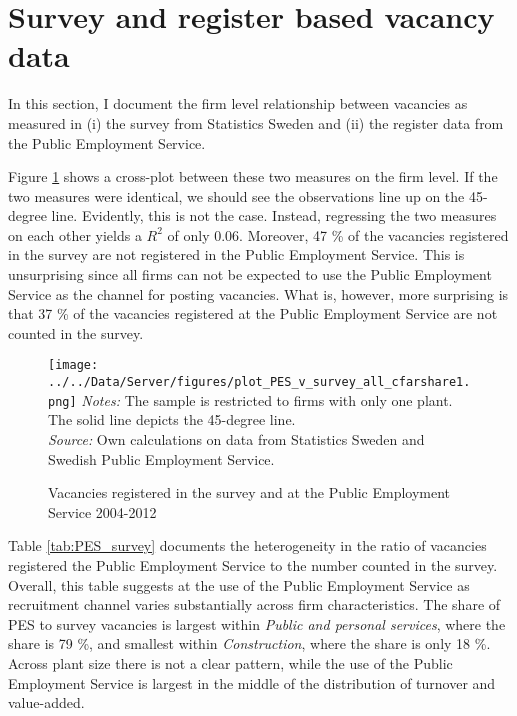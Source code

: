 \section{Survey and register based vacancy data}
\label{sec:PES_survey_rel} 

In this section, I document the firm level relationship between vacancies as measured in (i) the survey from Statistics Sweden and (ii) the register data from the Public Employment Service. 

Figure \ref{fig:agg_PES_survey_share} shows a cross-plot between these two measures on the firm level. If the two measures were identical, we should see the observations line up on the 45-degree line. Evidently, this is not the case. Instead, regressing the two measures on each other yields a $R^2$ of only 0.06. Moreover, 47 \% of the vacancies registered in the survey are not registered in the Public Employment Service. This is unsurprising since all firms can not be expected to use the Public Employment Service as the channel for posting vacancies. What is, however, more surprising is that 37 \% of the vacancies registered at the Public Employment Service are not counted in the survey.

\begin{figure}[h]
\centering
\caption{Vacancies registered in the survey and at the Public Employment Service 2004-2012 }
\texttt{[image: ../../Data/Server/figures/plot\_PES\_v\_survey\_all\_cfarshare1.png]}
\flushleft
\footnotesize{\emph{Notes:} The sample is restricted to firms with only one plant. The solid line depicts the 45-degree line.} \\
\footnotesize{\emph{Source:} Own calculations on data from Statistics Sweden and Swedish Public Employment Service.}
\label{fig:agg_PES_survey_share}
\end{figure}

Table \ref{tab:PES_survey} documents the heterogeneity in the ratio of vacancies registered the Public Employment Service to the number counted in the survey. Overall, this table suggests at the use of the Public Employment Service as recruitment channel varies substantially across firm characteristics. The share of PES to survey vacancies is largest within \emph{Public and personal services}, where the share is 79 \%, and smallest within \textit{Construction}, where the share is only 18 \%.  Across plant size there is not a clear pattern, while the use of the Public Employment Service is largest in the middle of the distribution of turnover and value-added.

